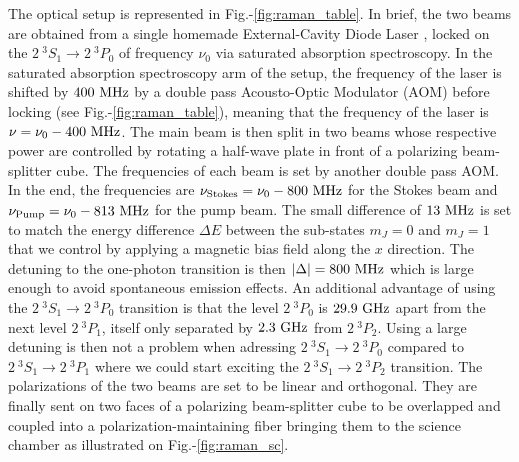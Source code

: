 The optical setup is represented in Fig.-\ref{fig:raman_table}. In brief, the two beams are obtained from a single homemade External-Cavity Diode Laser \cite{chao2019master}, locked on the $2 \ ^3 S_1 \rightarrow 2 \ ^3 P_0$ of frequency $\nu_0$ via saturated absorption spectroscopy. In the saturated absorption spectroscopy arm of the setup, the frequency of the laser is shifted by $400 \ \rm{MHz}$ by a double pass Acousto-Optic Modulator (AOM) before locking (see Fig.-\ref{fig:raman_table}), meaning that the frequency of the laser is $\nu = \nu_0 - 400 \ \rm{MHz}$. The main beam is then split in two beams whose respective power are controlled by rotating a half-wave plate in front of a polarizing beam-splitter cube. The frequencies of each beam is set by another double pass AOM. In the end, the frequencies are $\nu_{\rm{Stokes}} = \nu_0 - 800 \ \rm{MHz}$ for the Stokes beam and $\nu_{\rm{Pump}} = \nu_0 - 813 \ \rm{MHz}$ for the pump beam. The small difference of $13 \ \rm{MHz}$ is set to match the energy difference $\Delta E$ between the sub-states $m_J=0$ and $m_J=1$ that we control by applying a magnetic bias field along the $x$ direction. The detuning to the one-photon transition is then $|\Delta|=800 \ \rm{MHz}$ which is large enough to avoid spontaneous emission effects. An additional advantage of using the $2 \ ^3 S_1 \rightarrow 2 \ ^3 P_0$ transition is that the level $2 \ ^3 P_0$ is $29.9 \ \rm{GHz}$ apart from the next level $2 \ ^3 P_1$, itself only separated by $2.3 \ \rm{GHz}$ from $2 \ ^3 P_2$. Using a large detuning is then not a problem when adressing $2 \ ^3 S_1 \rightarrow 2 \ ^3 P_0$ compared to $2 \ ^3 S_1 \rightarrow 2 \ ^3 P_1$ where we could start exciting the $2 \ ^3 S_1 \rightarrow 2 \ ^3 P_2$ transition.
The polarizations of the two beams are set to be linear and orthogonal. They are finally sent on two faces of a polarizing beam-splitter cube to be overlapped and coupled into a polarization-maintaining fiber bringing them to the science chamber as illustrated on Fig.-\ref{fig:raman_sc}.

